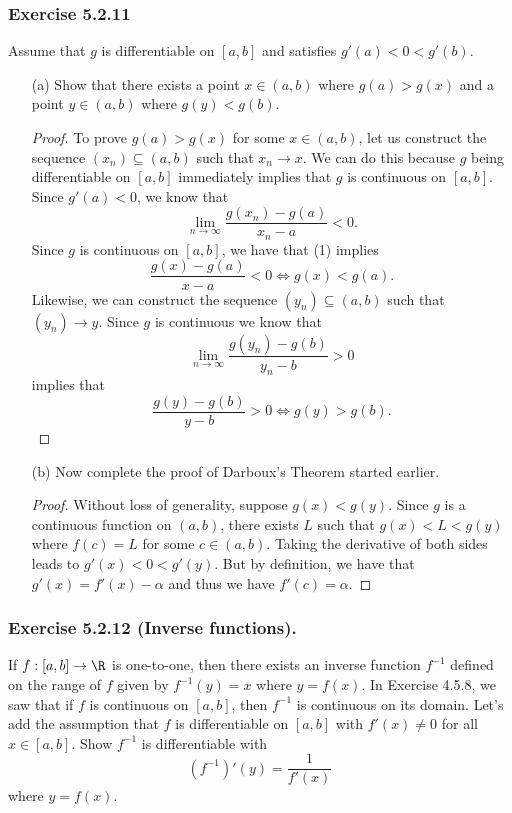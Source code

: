 \subsubsection{Exercise 5.2.11} Assume that \( g  \) is differentiable on \( [a,b] \) and satisfies \( g'(a) < 0 < g'(b)  \).
\begin{enumerate}
    \item[(a)] Show that there exists a point \( x \in (a,b)  \) where \( g(a) > g(x)  \) and a point \( y \in (a,b)  \) where \( g(y) < g(b) \).
        \begin{proof}
            To prove \( g(a) > g(x)  \) for some \( x \in (a,b)  \), let us construct the sequence \( (x_n) \subseteq (a,b)  \) such that \( x_n \to x \). We can do this because \( g  \) being differentiable on \( [a,b]  \) immediately implies that \( g  \) is continuous on \( [a,b]  \). Since \( g'(a) < 0   \), we know that 
            \[  \lim_{ n \to \infty  } \frac{ g(x_n) - g(a)  }{ x_n - a  } < 0  \tag{1}. \]
            Since \( g  \) is continuous on \( [a,b] \), we have that (1) implies
            \[ \frac{ g(x) - g(a)  }{ x - a  } < 0 \iff g(x) < g(a).     \]
            Likewise, we can construct the sequence \( (y_n) \subseteq (a,b)  \) such that \( (y_n) \to y  \). Since \( g  \) is continuous we know that 
            \[  \lim_{ n \to \infty  } \frac{ g(y_n) - g(b) }{ y_n - b  } > 0  \]
            implies that 
            \[  \frac{ g(y) - g(b)  }{ y - b } > 0 \iff g(y) > g(b). \]
        \end{proof}
    \item[(b)] Now complete the proof of  Darboux's Theorem started earlier.
        \begin{proof}
        Without loss of generality, suppose \( g(x) < g(y)  \). Since \( g  \) is a continuous function on \( (a,b)  \), there exists \( L  \) such that \( g(x) < L < g(y)  \) where \( f(c) = L  \) for some \( c \in (a,b)  \). Taking the derivative of both sides leads to \( g'(x) < 0 < g'(y)  \). But by definition, we have that \( g'(x) = f'(x) - \alpha    \) and thus we have \( f'(c) = \alpha \).
        \end{proof}
\end{enumerate}

\subsubsection{Exercise 5.2.12 (Inverse functions).} If \( f: [a,b] \to \R  \) is one-to-one, then there exists an inverse function \( f^{-1}  \) defined on the range of \( f  \) given by \( f^{-1}(y) = x  \) where \( y = f(x)  \). In Exercise 4.5.8, we saw that if \( f  \) is continuous on \( [a,b]  \), then \( f^{-1}  \) is continuous on its domain. Let's add the assumption that \( f  \) is differentiable on \( [a,b]  \) with \( f'(x) \neq 0  \) for all \( x \in [a,b]  \). Show \( f^{-1}  \) is differentiable with 
\[  (f^{-1})'(y) = \frac{ 1 }{ f'(x)  }  \] where \( y = f(x)  \).


